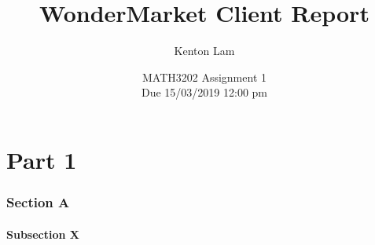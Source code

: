 \documentclass[11pt,a4paper]{article}
\author{Kenton Lam}
\date{{MATH3202 Assignment 1 \\ Due 15/03/2019 12:00 pm}}
\title{WonderMarket Client Report}
\begin{document}
\begin{titlepage}
\maketitle
\end{titlepage}

\part{Part 1}
\section{Section A}

\subsection{Subsection X}
\end{document}
